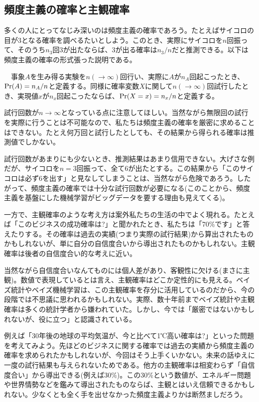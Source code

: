 \documentclass[dvipdfmx, 9pt, a4paper]{jsarticle}
\begin{document}
\subsection{頻度主義の確率と主観確率}
多くの人にとってなじみ深いのは頻度主義の確率であろう。たとえばサイコロの目が3となる確率を調べるたいとしよう。このとき、実際にサイコロを$n$回振って、そのうち$n_3$回3が出たならば、3が出る確率は$n_3/n$だと推測できる。以下は頻度主義の確率の形式張った説明である。
\begin{tcolorbox}[title=頻度主義の確率]
　事象$A$を生み得る実験を$n(\to \infty)$回行い、実際に$A$が$n_A$回起こったとき、${\rm Pr}(A)=n_A/n$と定義する。同様に確率変数$X$に関して$n(\to \infty)$回試行したとき、実現値$x$が$n_x$回起こったならば、${\rm Pr}(X=x)=n_x/n$と定義する。
\end{tcolorbox}
試行回数が$n \to \infty$となっている点に注意してほしい。当然ながら無限回の試行を実際に行うことは不可能なので、私たちは頻度主義の確率を厳密に求めることはできない。たとえ何万回と試行したとしても、その結果から得られる確率は推測値でしかない。\par
試行回数があまりにも少ないとき、推測結果はあまり信用できない。大げさな例だが、サイコロを$n=3$回振って、全て6が出たとする。この結果から「このサイコロは必ず6を出す」と見なしてしまうことは、当然ながら危険であろう。したがって、頻度主義の確率では十分な試行回数が必要になる(このことから、頻度主義を基盤にした機械学習がビッグデータを要する理由も見えてくる)。\par
一方で、主観確率のような考え方は案外私たちの生活の中でよく現れる。たとえば「このビジネスの成功確率は?」と聞かれたとき、私たちは「70\%です」と答えたりする。その確率は過去の実績(つまり実際の試行結果)から算出されたものかもしれないが、単に自分の自信度合いから導出されたものかもしれない。主観確率は後者の自信度合い的な考えに近い。\par
当然ながら自信度合いなんてものには個人差があり、客観性に欠ける(まさに主観)。数値で表現しているとは言え、主観確率はどこか定性的にも見える。ベイズ統計やベイズ機械学習は、この主観確率を存分に活用しているのだから、今の段階では不思議に思われるかもしれない。実際、数十年前までベイズ統計や主観確率は多くの統計学者から嫌われていた。しかし、今では「厳密ではないかもしれないが、役に立つ」と認識されている。\par
例えば「30年後の地球の平均気温が、今と比べて1℃高い確率は?」といった問題を考えてみよう。先ほどのビジネスに関する確率では過去の実績から頻度主義の確率を求められたかもしれないが、今回はそう上手くいかない。未来の話ゆえに一度の試行結果も与えられないためである。他方の主観確率は相変わらず「自信度合い」から導出できる(例えば30\%)。この30\%という数値が、エネルギー問題や世界情勢などを鑑みて導出されたものならば、主観とはいえ信頼できるかもしれない。少なくとも全く手を出せなかった頻度主義よりかは断然ましだろう。\par
\end{document}

